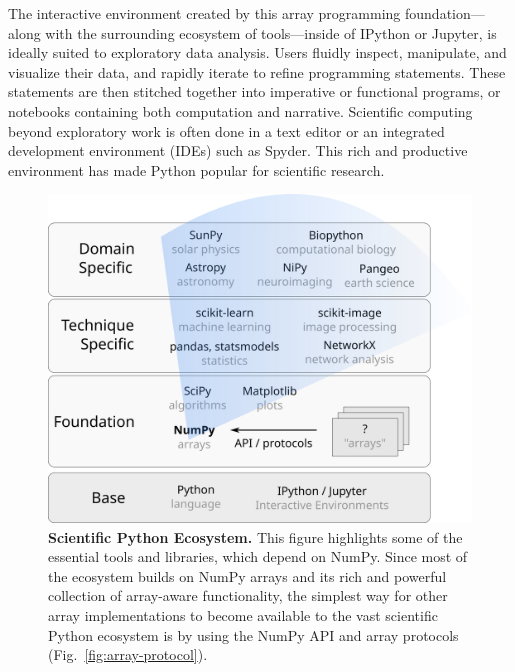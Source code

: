 The interactive environment created by this array programming
foundation---along with the surrounding ecosystem of tools---inside of
IPython or Jupyter, is ideally suited to exploratory data analysis.
Users fluidly inspect, manipulate, and visualize their data, and
rapidly iterate to refine programming statements. These statements are
then stitched together into imperative or functional programs, or
notebooks containing both computation and narrative.
Scientific computing beyond exploratory work is often done in a text editor
or an integrated development environment (IDEs) such as Spyder.
This rich and productive environment has made Python popular
for scientific research.

\begin{figure}
  \centering
  \includegraphics[width=.45\textwidth]{static/sketches/ecosystem}
  \caption{\textbf{Scientific Python Ecosystem.}
   This figure highlights some of the essential tools and libraries, which depend
   on NumPy.  Since most of the ecosystem
   builds on NumPy arrays and its rich and powerful collection of array-aware
   functionality, the simplest way for other array implementations to become
   available to the vast scientific Python ecosystem is by using the NumPy API and array
   protocols (Fig.~\ref{fig:array-protocol}).
  }
  \label{fig:ecosystem}
\end{figure}

